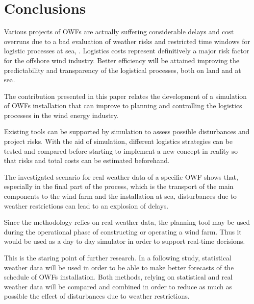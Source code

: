 \section{Conclusions}
Various projects of OWFs are actually suffering considerable delays and cost overruns due to a bad evaluation of weather risks and restricted time windows for logistic processes at sea, \cite{TCE12, ISOPE2013}. Logistics costs represent definitively a major risk factor for the offshore wind industry. Better efficiency will be attained improving the predictability and transparency of the logistical processes, both on land and at sea.

The contribution presented in this paper relates the development of a 
simulation of OWFs installation that can improve to planning and controlling the logistics processes in the wind energy industry.

Existing tools can be supported by simulation to assess possible disturbances and project risks. With the aid of simulation, different logistics strategies can be tested and compared before starting to implement a new concept in reality so that risks and total costs can be estimated beforehand.

The investigated scenario for real weather data of a specific OWF shows that, especially in the final part of the process, which is the transport of the main components to the wind farm and the installation at sea, disturbances due to weather restrictions can lead to an explosion of delays. 

Since the methodology relies on real weather data, the planning tool may be used during the operational phase of constructing or operating a wind farm. Thus it would be used as a day to day simulator in order to support real-time decisions.

This is the staring point of further research. In a following study, statistical weather data will be used in order to be able to make better forecasts of the schedule of OWFs installation. Both methods, relying on statistical and real weather data will be compared and combined in order to reduce as much as possible the effect of disturbances due to weather restrictions.